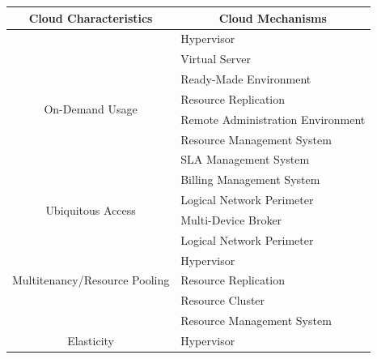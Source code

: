 \begin{table}[hbt!]
\centering
\begin{tabular}{|c|l|} 
\hline
\rowcolor[rgb]{0.871,0.871,0.871} Cloud Characteristics & \multicolumn{1}{c|}{Cloud Mechanisms}  \\ 
\hline
\multirow{8}{*}{On-Demand Usage}                        & Hypervisor                             \\ 
\cline{2-2}
                                                        & Virtual Server                         \\ 
\cline{2-2}
                                                        & Ready-Made Environment                 \\ 
\cline{2-2}
                                                        & Resource Replication                   \\ 
\cline{2-2}
                                                        & Remote Administration Environment      \\ 
\cline{2-2}
                                                        & Resource Management System             \\ 
\cline{2-2}
                                                        & SLA Management System                  \\ 
\cline{2-2}
                                                        & Billing Management System              \\ 
\hline
\multirow{2}{*}{Ubiquitous Access}                      & Logical Network Perimeter              \\ 
\cline{2-2}
                                                        & Multi-Device Broker                    \\ 
\hline
\multirow{5}{*}{Multitenancy/Resource Pooling}          & Logical Network Perimeter              \\ 
\cline{2-2}
                                                        & Hypervisor                             \\ 
\cline{2-2}
                                                        & Resource Replication                   \\ 
\cline{2-2}
                                                        & Resource Cluster                       \\ 
\cline{2-2}
                                                        & Resource Management System             \\ 
\hline
\multirow{6}{*}{Elasticity}                             & Hypervisor                             \\ 

\end{tabular}
\end{table}

